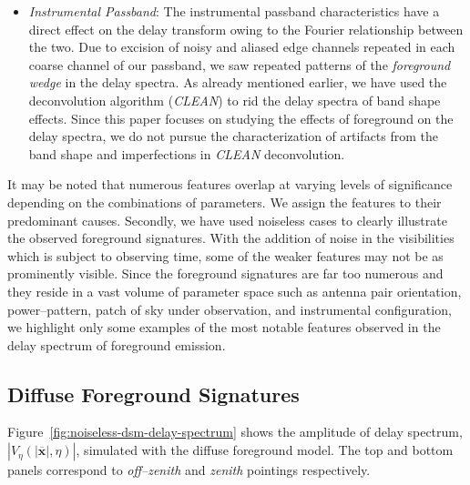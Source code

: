 \documentclass[preprint2,iop,numberedappendix]{emulateapj}
\begin{document}
\begin{itemize}
\item {\it Instrumental Passband}: The instrumental passband characteristics have a direct effect on the delay transform owing to the Fourier relationship between the two. Due to excision of noisy and aliased edge channels repeated in each coarse channel of our passband, we saw repeated patterns of the {\it foreground wedge} in the delay spectra. As already mentioned earlier, we have used the deconvolution algorithm ({\it CLEAN}) to rid the delay spectra of band shape effects. Since this paper focuses on studying the effects of foreground on the delay spectra, we do not pursue the characterization of artifacts from the band shape and imperfections in {\it CLEAN} deconvolution.

\end{itemize}

It may be noted that numerous features overlap at varying levels of significance depending on the combinations of parameters. We assign the features to their predominant causes. Secondly, we have used noiseless cases to clearly illustrate the observed foreground signatures. With the addition of noise in the visibilities which is subject to observing time, some of the weaker features may not be as prominently visible. Since the foreground signatures are far too numerous and they reside in a vast volume of parameter space such as antenna pair orientation, power--pattern, patch of sky under observation, and instrumental configuration, we highlight only some examples of the most notable features observed in the delay spectrum of foreground emission.

\subsection{Diffuse Foreground Signatures}\label{sec:diffuse}

Figure~\ref{fig:noiseless-dsm-delay-spectrum} shows the amplitude of delay spectrum, $|V_\eta(|\overline{\mathbf{x}}|,\eta)|$, simulated with the diffuse foreground model. The top and bottom panels correspond to {\it off--zenith} and {\it zenith} pointings respectively. 
\end{document}
